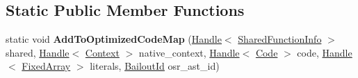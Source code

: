 \subsection*{Static Public Member Functions}
\begin{DoxyCompactItemize}
\item 
\hypertarget{classv8_1_1internal_1_1_shared_function_info_a4df31e615e0ec8ee7ffb1730ff6a7aa1}{}static void {\bfseries Add\+To\+Optimized\+Code\+Map} (\hyperlink{classv8_1_1internal_1_1_handle}{Handle}$<$ \hyperlink{classv8_1_1internal_1_1_shared_function_info}{Shared\+Function\+Info} $>$ shared, \hyperlink{classv8_1_1internal_1_1_handle}{Handle}$<$ \hyperlink{classv8_1_1internal_1_1_context}{Context} $>$ native\+\_\+context, \hyperlink{classv8_1_1internal_1_1_handle}{Handle}$<$ \hyperlink{classv8_1_1internal_1_1_code}{Code} $>$ code, \hyperlink{classv8_1_1internal_1_1_handle}{Handle}$<$ \hyperlink{classv8_1_1internal_1_1_fixed_array}{Fixed\+Array} $>$ literals, \hyperlink{classv8_1_1internal_1_1_bailout_id}{Bailout\+Id} osr\+\_\+ast\+\_\+id)\label{classv8_1_1internal_1_1_shared_function_info_a4df31e615e0ec8ee7ffb1730ff6a7aa1}

\end{DoxyCompactItemize}
